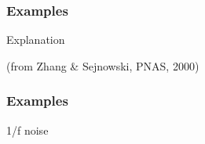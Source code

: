 \begin{frame}
  \frametitle{Examples}

  Explanation

  \hfill{\tiny(from Zhang \& Sejnowski, PNAS, 2000)}


\end{frame}

\begin{frame}
  \frametitle{Examples}

  1/f noise

\end{frame}






